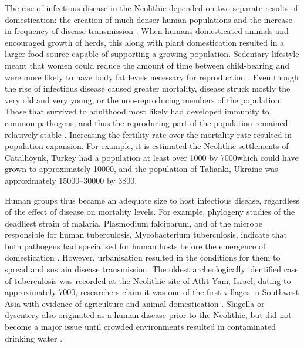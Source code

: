 The  rise of infectious disease in the Neolithic depended on two separate results of domestication: the creation of much denser human populations and the increase in frequency of disease transmission \parencite[703--704]{Diamond_2002}. 
When humans domesticated animals and encouraged growth of herds, this along with plant domestication resulted in a larger food source capable of supporting a growing population. Sedentary lifestyle meant that women could reduce the amount of time between 
child-bearing and were more likely to have body fat levels 
necessary for reproduction \parencites[333]{Lee_1980}{Wilmsen_1990}. 
Even though the rise of infectious disease caused greater mortality, 
disease struck mostly the very old and very young, or the non-reproducing 
members of the population. Those that survived to adulthood most likely
 had developed immunity to common pathogens, and thus the reproducing 
part of the population remained relatively stable \parencite[18]{Armelagos_1991}. 
Increasing the fertility rate over the mortality rate resulted in population expansion. 
For example, it is estimated the Neolithic settlements of Catalhöyük, Turkey 
had a population at least over \num{1000} by 7000\BC which could have grown to approximately \num{10000}, 
and the population of Talianki, Ukraine was approximately \num{15000}--\num{30000} by 3800\BC \parencites{Hodder_2011}{Kohl_2009}. 

Human groups thus became an adequate size to host infectious disease, regardless of the effect of disease on mortality levels. 
For example, phylogeny studies of the deadliest strain of malaria, Plasmodium falciparum, and of the microbe responsible for human tuberculosis, 
Mycobacterium tuberculosis, indicate that both pathogens had specialised for human hosts before the emergence of domestication \parencite[373--374]{Pearce-Duvet_2006}. 
However, urbanisation resulted in the conditions for them to spread and sustain disease transmission. The oldest archeologically identified case of tuberculosis was recorded at the Neolithic site of Atlit-Yam, Israel; 
dating to approximately 7000\BC, researchers claim it was one of the first villages in Southwest Asia with evidence of agriculture and animal domestication \parencite{Hershkovitz_2008}. 
Shigella or dysentery also originated as a human disease prior to the Neolithic, 
but did not become a major issue until crowded environments resulted in contaminated 
drinking water \parencite[119]{Diamond_1987}. 

